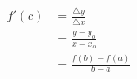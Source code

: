 \documentclass[preview]{standalone}
\begin{document}
\begin{align*}
f'(c)&=\frac{\triangle y}{\triangle x}\\&=\frac{y-y_o}{x-x_o}\\ &=\frac{f(b)-f(a)}{b-a}
\end{align*}
\end{document}
